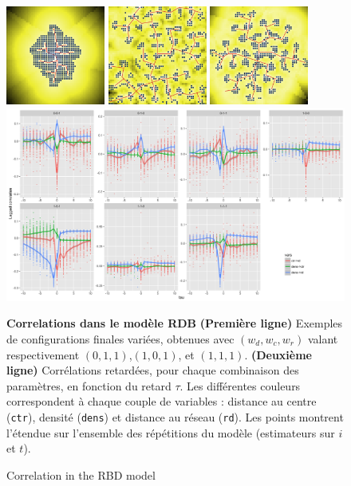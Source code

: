 \begin{figure}%
\centering
\includegraphics[width=0.29\textwidth]{Figures/CausalityRegimes/ex_60_wdens0_wroad1_wcenter1_seed272727}
\includegraphics[width=0.29\textwidth]{Figures/CausalityRegimes/ex_60_wdens1_wroad1_wcenter0_seed272727}
\includegraphics[width=0.29\textwidth]{Figures/CausalityRegimes/ex_60_wdens1_wroad1_wcenter1_seed272727}\\\vspace{0.2cm}
\includegraphics[width=\textwidth]{Figures/CausalityRegimes/laggedcorrs_facetextreme}
\caption{Correlation in the RBD model}{\textbf{Correlations dans le modèle RDB} \textbf{(Première ligne)} Exemples de configurations finales variées, obtenues avec $(w_{d},w_{c},w_{r})$ valant respectivement $(0,1,1)$,$(1,0,1)$, et $(1,1,1)$. \textbf{(Deuxième ligne)} Corrélations retardées, pour chaque combinaison des paramètres, en fonction du retard $\tau$. Les différentes couleurs correspondent à chaque couple de variables : distance au centre (\texttt{ctr}), densité (\texttt{dens}) et distance au réseau (\texttt{rd}). Les points montrent l'étendue sur l'ensemble des répétitions du modèle (estimateurs sur $i$ et $t$).}
\label{fig:exrdb}
\end{figure}



